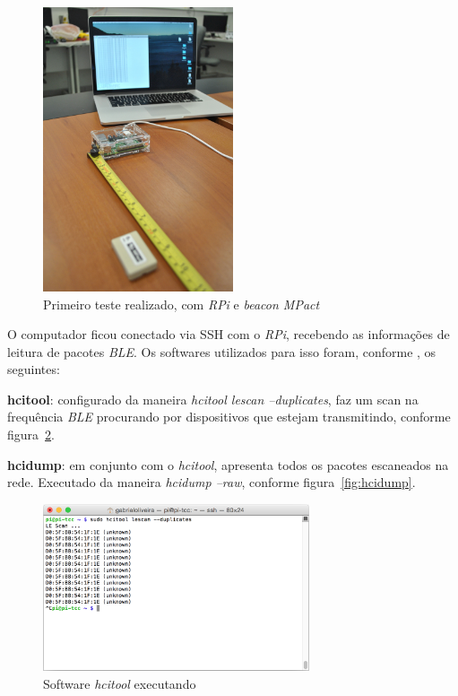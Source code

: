 \documentclass[
		12pt,				%
		openright,			%
		oneside,			%
		a4paper,			%
		chapter=TITLE,		%
		english,			%
		brazil				%
	]{abntex2}
\begin{document}
\begin{figure}[htb]
	\caption{\label{fig:inicio-ambiente}Primeiro teste realizado, com \textit{RPi} e \textit{beacon MPact}}
	\begin{center}
		\includegraphics[width=0.5\textwidth]{img/ambiente1.jpg}
	\end{center}
\end{figure}

O computador ficou conectado via SSH com o \textit{RPi}, recebendo as informações de leitura de pacotes \textit{BLE}. Os softwares utilizados para isso foram, conforme , os seguintes:

\begin{alineas}
	\item \textbf{hcitool}: configurado da maneira \textit{hcitool lescan --duplicates}, faz um scan na frequência \textit{BLE} procurando por dispositivos que estejam transmitindo, conforme figura~\ref{fig:hcitool-lescan}.
	\item \textbf{hcidump}: em conjunto com o \textit{hcitool}, apresenta todos os pacotes escaneados na rede. Executado da maneira \textit{hcidump --raw}, conforme figura~\ref{fig:hcidump}.
\end{alineas}

\begin{figure}[htb]
	\caption{\label{fig:hcitool-lescan}Software \textit{hcitool} executando}
	\begin{center}
		\includegraphics[width=0.7\textwidth]{img/hcitool-lescan.png}
	\end{center}
\end{figure}
\end{document}
